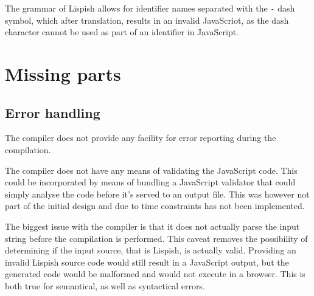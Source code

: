 The grammar of Lispish allows for identifier names separated with the \texttt{-} dash symbol, which after translation, results in an invalid JavaScriot, as the dash character cannot be used as part of an identifier in JavaScript.

\section{Missing parts}
\subsection{Error handling}
The compiler does not provide any facility for error reporting during the compilation.

The compiler does not have any means of validating the JavaScript code. This could be incorporated by means of bundling a JavaScript validator that could simply analyse the code before it's served to an output file. This was however not part of the initial design and due to time constraints has not been implemented.

The biggest issue with the compiler is that it does not actually parse the input string before the compilation is performed. This caveat removes the possibility of determining if the input source, that is Lispish, is actually valid. 
Providing an invalid Lispish source code would still result in a JavaScript output, but the generated code would be malformed and would not execute in a browser. This is both true for semantical, as well as syntactical errors.